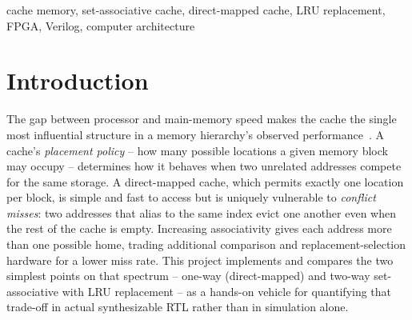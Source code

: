 \documentclass[conference]{IEEEtran}
\begin{document}
\begin{abstract}
Cache organization is a first-order driver of memory-system performance, yet the cost/benefit trade-off of adding associativity is rarely made concrete for students designing cache hardware from scratch. This paper presents the Phase~I design of two competing cache architectures implemented in Verilog for a Modern Computer Architecture course project: a direct-mapped cache and a 2-way set-associative cache with least-recently-used (LRU) replacement, both sized to hold an identical 2~KB of data so that any difference in behavior is attributable to associativity alone rather than capacity. We detail the address decomposition, module-level architecture, and finite-state-machine control logic shared by both designs, and describe the trace-driven evaluation methodology -- randomized, locality-biased, and adversarial conflict-access traces -- used to measure hit rate, together with the FPGA synthesis flow used to quantify the resource and timing cost of the second way. Both designs are implemented and verified in simulation: on the conflict trace the direct-mapped cache hits on 0.00\% of accesses while the 2-way cache hits on 99.90\%, and on the locality trace the 2-way cache raises the hit rate from 88.35\% to 89.40\% and cuts average access time from 3.06 to 1.90 cycles. FPGA resource and timing results will be reported in the project's next phase once synthesis is finalized.
\end{abstract}

\begin{IEEEkeywords}
cache memory, set-associative cache, direct-mapped cache, LRU replacement, FPGA, Verilog, computer architecture
\end{IEEEkeywords}

\section{Introduction}
The gap between processor and main-memory speed makes the cache the single most influential structure in a memory hierarchy's observed performance~\cite{hennessy2017}. A cache's \emph{placement policy} -- how many possible locations a given memory block may occupy -- determines how it behaves when two unrelated addresses compete for the same storage. A direct-mapped cache, which permits exactly one location per block, is simple and fast to access but is uniquely vulnerable to \emph{conflict misses}: two addresses that alias to the same index evict one another even when the rest of the cache is empty. Increasing associativity gives each address more than one possible home, trading additional comparison and replacement-selection hardware for a lower miss rate. This project implements and compares the two simplest points on that spectrum -- one-way (direct-mapped) and two-way set-associative with LRU replacement -- as a hands-on vehicle for quantifying that trade-off in actual synthesizable RTL rather than in simulation alone.
\end{document}
